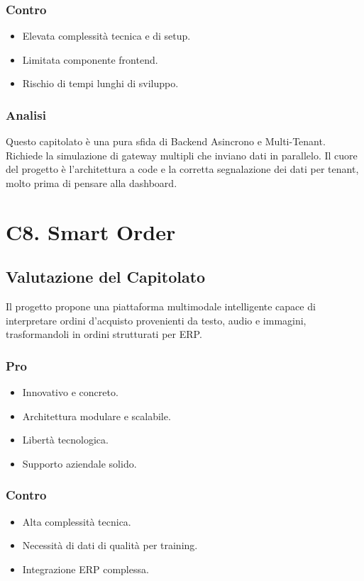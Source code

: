 \documentclass[a4paper, 11pt, oneside]{scrartcl} %
\begin{document}
\subsubsection*{Contro}
\begin{itemize}
    \item Elevata complessità tecnica e di setup.
    \item Limitata componente frontend.
    \item Rischio di tempi lunghi di sviluppo.
\end{itemize}
\subsubsection*{Analisi}
Questo capitolato è una pura sfida di Backend Asincrono e Multi-Tenant. Richiede la simulazione di gateway multipli che inviano dati in parallelo. Il cuore del progetto è l'architettura a code e la corretta segnalazione dei dati per tenant, molto prima di pensare alla dashboard.
\section{C8. Smart Order}
\subsection*{Valutazione del Capitolato}
Il progetto propone una piattaforma multimodale intelligente capace di interpretare ordini d’acquisto provenienti da testo, audio e immagini, trasformandoli in ordini strutturati per ERP.

\subsubsection*{Pro}
\begin{itemize}
    \item Innovativo e concreto.
    \item Architettura modulare e scalabile.
    \item Libertà tecnologica.
    \item Supporto aziendale solido.
\end{itemize}

\subsubsection*{Contro}
\begin{itemize}
    \item Alta complessità tecnica.
    \item Necessità di dati di qualità per training.
    \item Integrazione ERP complessa.
\end{itemize}
\end{document}

